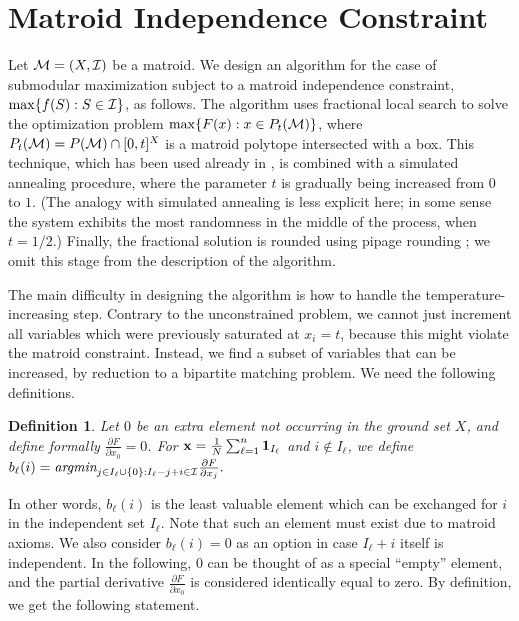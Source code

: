 \documentclass{article}[11pt]
\newtheorem{definition}[theorem]{Definition}
\newcommand{\partdiff}[2]{\frac{\partial {#1}}{\partial {#2}}}
\def\b1{{\bf 1}}
\def\bx{{\bf x}}
\def\cM{{\cal M}}
\def\cI{{\cal I}}
\def\max{{\rm{max}}}
\begin{document}
\section{Matroid Independence Constraint}
\label{sec:matroid-constraint}


Let $\cM =(X, \cI)$ be a matroid.
We design an algorithm for the case of submodular maximization subject
to a matroid independence constraint, $\max \{f(S): S \in \cI \}$, as follows. The algorithm uses
fractional local search to solve the optimization problem $\max \{ F(x): x \in P_t(\cM) \}$,
where $P_t(\cM) = P(\cM) \cap [0,t]^X$ is a matroid polytope intersected with a box.
This technique, which has been used already in \cite{Vondrak09},
is combined with a simulated annealing procedure, where the parameter
$t$ is gradually being increased from $0$ to $1$. (The analogy with simulated annealing
is less explicit here; in some sense the system exhibits the most randomness in the middle
of the process, when $t = 1/2$.)  Finally, the fractional solution is rounded
using pipage rounding \cite{CCPV07,Vondrak09}; we omit this stage from the description
of the algorithm.

The main difficulty in designing the algorithm is how to handle the temperature-increasing
step. Contrary to the unconstrained problem, we cannot just increment all variables
which were previously saturated at $x_i=t$, because this might violate the matroid constraint.
Instead, we find a subset of variables that can be increased, by reduction to a bipartite matching
problem. We need the following definitions.

\begin{definition}
\label{def:best-match}
Let $0$ be an extra element not occurring in the ground set $X$, and define formally
$\partdiff{F}{x_0} = 0$. 
For $\bx = \frac{1}{N} \sum_{\ell=1}^{n} \b1_{I_\ell}$ and $i \notin I_\ell$,
we define 
$ b_\ell(i) = \mbox{\em argmin}_{j \in I_\ell \cup \{0\}: I_\ell-j+i \in \cI} \partdiff{F}{x_j}.$
\end{definition}

In other words, $b_\ell(i)$ is the least valuable element which can be exchanged for $i$
in the independent set $I_\ell$. Note that such an element must exist due to matroid axioms.
We also consider $b_\ell(i)=0$ as an option in case $I_\ell + i$ itself is independent.
In the following, $0$ can be thought of as a special ``empty'' element,
and the partial derivative $\partdiff{F}{x_0}$ is considered identically equal to zero.
By definition, we get the following statement.
\end{document}
